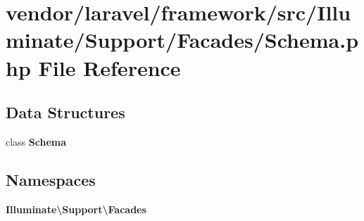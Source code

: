 \section{vendor/laravel/framework/src/\+Illuminate/\+Support/\+Facades/\+Schema.php File Reference}
\label{_schema_8php}
\subsection*{Data Structures}
\begin{DoxyCompactItemize}
\item 
class {\bf Schema}
\end{DoxyCompactItemize}
\subsection*{Namespaces}
\begin{DoxyCompactItemize}
\item 
 {\bf Illuminate\textbackslash{}\+Support\textbackslash{}\+Facades}
\end{DoxyCompactItemize}
